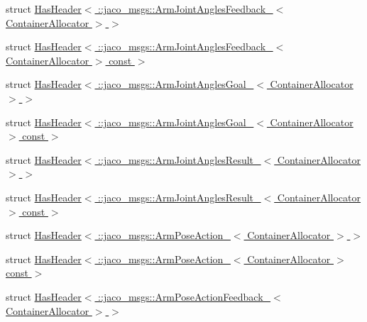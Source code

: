 \begin{DoxyCompactItemize}
\item 
struct \hyperlink{structros_1_1message__traits_1_1HasHeader_3_01_1_1jaco__msgs_1_1ArmJointAnglesFeedback___3_01ContainerAllocator_01_4_01_4}{Has\+Header$<$ \+::jaco\+\_\+msgs\+::\+Arm\+Joint\+Angles\+Feedback\+\_\+$<$ Container\+Allocator $>$ $>$}
\item 
struct \hyperlink{structros_1_1message__traits_1_1HasHeader_3_01_1_1jaco__msgs_1_1ArmJointAnglesFeedback___3_01Cona0dd94fb0bf5637f1c388a949add7469}{Has\+Header$<$ \+::jaco\+\_\+msgs\+::\+Arm\+Joint\+Angles\+Feedback\+\_\+$<$ Container\+Allocator $>$ const  $>$}
\item 
struct \hyperlink{structros_1_1message__traits_1_1HasHeader_3_01_1_1jaco__msgs_1_1ArmJointAnglesGoal___3_01ContainerAllocator_01_4_01_4}{Has\+Header$<$ \+::jaco\+\_\+msgs\+::\+Arm\+Joint\+Angles\+Goal\+\_\+$<$ Container\+Allocator $>$ $>$}
\item 
struct \hyperlink{structros_1_1message__traits_1_1HasHeader_3_01_1_1jaco__msgs_1_1ArmJointAnglesGoal___3_01Containe15395c27dba8d2d68261a8c2bd6b5b6}{Has\+Header$<$ \+::jaco\+\_\+msgs\+::\+Arm\+Joint\+Angles\+Goal\+\_\+$<$ Container\+Allocator $>$ const  $>$}
\item 
struct \hyperlink{structros_1_1message__traits_1_1HasHeader_3_01_1_1jaco__msgs_1_1ArmJointAnglesResult___3_01ContainerAllocator_01_4_01_4}{Has\+Header$<$ \+::jaco\+\_\+msgs\+::\+Arm\+Joint\+Angles\+Result\+\_\+$<$ Container\+Allocator $>$ $>$}
\item 
struct \hyperlink{structros_1_1message__traits_1_1HasHeader_3_01_1_1jaco__msgs_1_1ArmJointAnglesResult___3_01Contafab1ed2067aba2055816da71d4bf6feb}{Has\+Header$<$ \+::jaco\+\_\+msgs\+::\+Arm\+Joint\+Angles\+Result\+\_\+$<$ Container\+Allocator $>$ const  $>$}
\item 
struct \hyperlink{structros_1_1message__traits_1_1HasHeader_3_01_1_1jaco__msgs_1_1ArmPoseAction___3_01ContainerAllocator_01_4_01_4}{Has\+Header$<$ \+::jaco\+\_\+msgs\+::\+Arm\+Pose\+Action\+\_\+$<$ Container\+Allocator $>$ $>$}
\item 
struct \hyperlink{structros_1_1message__traits_1_1HasHeader_3_01_1_1jaco__msgs_1_1ArmPoseAction___3_01ContainerAllocator_01_4_01const_01_01_4}{Has\+Header$<$ \+::jaco\+\_\+msgs\+::\+Arm\+Pose\+Action\+\_\+$<$ Container\+Allocator $>$ const  $>$}
\item 
struct \hyperlink{structros_1_1message__traits_1_1HasHeader_3_01_1_1jaco__msgs_1_1ArmPoseActionFeedback___3_01ContainerAllocator_01_4_01_4}{Has\+Header$<$ \+::jaco\+\_\+msgs\+::\+Arm\+Pose\+Action\+Feedback\+\_\+$<$ Container\+Allocator $>$ $>$}

\end{DoxyCompactItemize}
